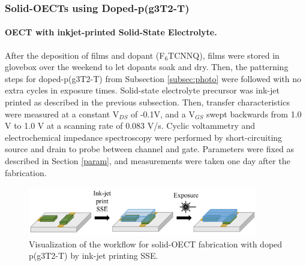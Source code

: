 \subsubsection{Solid-OECTs using Doped-p(g3T2-T)}

\paragraph{OECT with inkjet-printed Solid-State Electrolyte.}After the deposition of films and dopant (F$_{6}$TCNNQ), films were stored in glovebox over the weekend to let dopants soak and dry. Then, the patterning steps for doped-p(g3T2-T) from Subsection \ref{subsec:photo} were followed with no extra cycles in exposure times. Solid-state electrolyte precursor was ink-jet printed as described in the previous subsection. Then, transfer characteristics were measured at a constant V$_{DS}$ of -0.1V, and  a  V$_{GS}$ swept backwards from 1.0 V to 1.0 V at a scanning rate of 0.083 V/s. Cyclic voltammetry and electrochemical impedance spectroscopy were performed by short-circuiting source and drain to probe between channel and gate. Parameters were fixed as described in Section \ref{param}, and measurements were taken one day after the fabrication.

\begin{figure}[!ht]
	\centering
	\includegraphics[width=10cm]{Images/pdf/doped-sse.pdf}
	\caption[Solid-OECT fabrication with doped p(g3T2-T)]{Visualization of the workflow for solid-OECT fabrication with doped p(g3T2-T) by ink-jet printing SSE.}
	\label{fig:dopedsse}
\end{figure}

